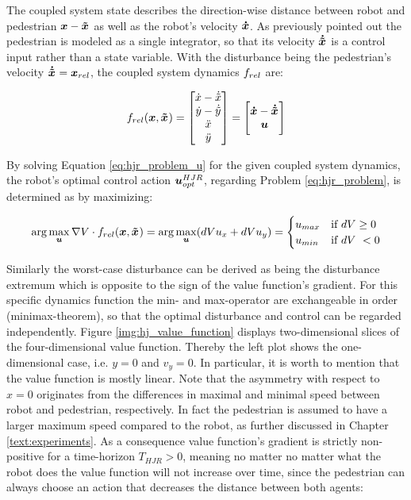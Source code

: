 The coupled system state describes the direction-wise distance between robot and pedestrian $\x - \xped[]$ as well as the robot's velocity $\boldsymbol{\dot{x}}$. As previously pointed out the pedestrian is modeled as a single integrator, so that its velocity $\dxped[]$ is a control input rather than a state variable. With the disturbance being the pedestrian's velocity $\dxped[] = \d$, the coupled system dynamics $f_{rel}$ are: 

\begin{equation}
\frel(\x, \xped[]) = 
\begin{bmatrix} 
\dot{x} - \dot{\tilde{x}} \\  
\dot{y} - \dot{\tilde{y}} \\  
\ddot{x} \\
\ddot{y} 
\end{bmatrix} = 
\begin{bmatrix} 
\dx - \dxped[] \\ 
\u
\end{bmatrix}
\label{eq:hj_dynamics}
\end{equation}

By solving Equation \ref{eq:hjr_problem_u} for the given coupled system dynamics, the robot's optimal control action $\boldsymbol{u}_{opt}^{HJR}$, regarding Problem \ref{eq:hjr_problem}, is determined as by maximizing:

\begin{equation}
\arg \max_{\u} \nabla \Vrel \cdot \frel(\x, \xped[]) = \arg \max_{\u} (d\Vrel u_x + d\Vrel u_y) = 
\begin{cases}
u_{max} & \text{if } d\Vrel \geq 0 \\
u_{min} & \text{if } d\Vrel < 0	
\end{cases}
\label{eq:hj_u_opt}
\end{equation}

Similarly the worst-case disturbance can be derived as being the disturbance extremum which is opposite to the sign of the value function's gradient. For this specific  dynamics function the min- and max-operator are exchangeable in order (minimax-theorem), so that the optimal disturbance and control can be regarded independently.
\newline
Figure \ref{img:hj_value_function} displays two-dimensional slices of the four-dimensional value function. Thereby the left plot shows the one-dimensional case, i.e. $y = 0$ and $v_y = 0$. In particular, it is worth to mention that the value function is mostly linear. Note that the asymmetry with respect to $x = 0$ originates from the differences in maximal and minimal speed between robot and pedestrian, respectively.  In fact the pedestrian is assumed to have a larger maximum speed compared to the robot, as further discussed in Chapter \ref{text:experiments}. As a consequence value function's gradient is strictly non-positive for a time-horizon $T_{HJR} > 0$, meaning no matter no matter what the robot does the value function will not increase over time, since the pedestrian can always choose an action that decreases the distance between both agents:

